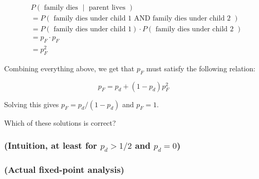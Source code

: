 \begin{align*}
&P\left(\text{ family dies } \middle| \text{ parent lives }\right) \\
&= P\left(\text{ family dies under child 1 AND family dies under child 2 } \right) \\
&= P\left(\text{ family dies under child 1} \right) \cdot P\left(\text{ family dies under child 2 } \right) \\
&= p_F \cdot p_F \\
&= p_F^2
\end{align*}


Combining everything above, we get that $p_F$ must satisfy the following relation:

\begin{equation}
p_F = p_d + (1-p_d)p_F^2
\end{equation}


Solving this gives $p_F = p_d / (1 - p_d)$ and $p_F = 1$. 

Which of these solutions is correct? 





\subsubsection{(Intuition, at least for $p_d > 1/2$ and $p_d = 0$)}

\subsubsection{(Actual fixed-point analysis)}



